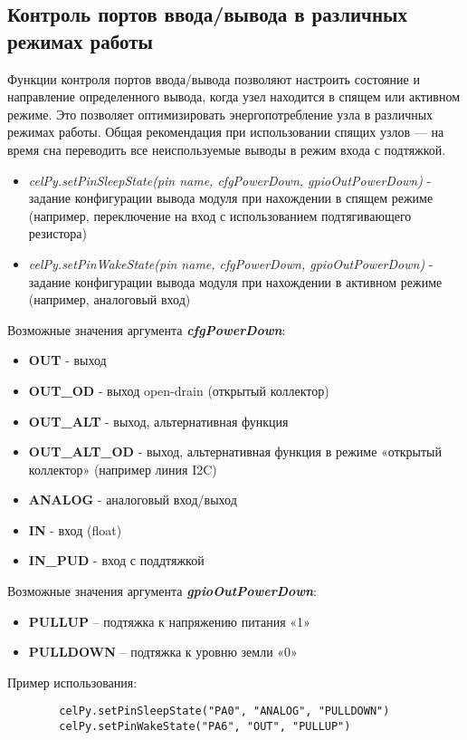 \documentclass[12pt]{article}
\begin{document}
\subsection{Контроль портов ввода/вывода в различных режимах работы}
Функции контроля портов ввода/вывода позволяют настроить состояние и направление
определенного вывода, когда узел находится в спящем или активном режиме.
Это позволяет оптимизировать энергопотребление узла в различных режимах работы.
Общая рекомендация при использовании спящих узлов --- на время сна переводить все
неиспользуемые выводы в режим входа с подтяжкой.
    \begin{itemize}
    \item \emph{celPy.setPinSleepState(pin name, cfgPowerDown, gpioOutPowerDown)}
    - задание конфигурации вывода модуля при нахождении в спящем режиме (например, 
    переключение на вход с использованием подтягивающего резистора)
    \item \emph{celPy.setPinWakeState(pin name, cfgPowerDown, gpioOutPowerDown)}
    - задание конфигурации вывода модуля при нахождении в активном режиме (например,
    аналоговый вход)
    \end{itemize}

Возможные значения аргумента \textit{\textbf{cfgPowerDown}}:
    \begin{itemize}
    \item \textbf{OUT} - выход
    \item \textbf{OUT_OD} - выход open-drain (открытый коллектор)
    \item \textbf{OUT_ALT} - выход, альтернативная функция 
    \item \textbf{OUT_ALT_OD} - выход, альтернативная функция в режиме «открытый коллектор» (например линия I2C)
    \item \textbf{ANALOG} - аналоговый вход/выход
    \item \textbf{IN} - вход (float)
    \item \textbf{IN_PUD} - вход с поддтяжкой
    \end{itemize}
    
Возможные значения аргумента \textit{\textbf{gpioOutPowerDown}}:
    \begin{itemize}
    \item \textbf{PULLUP} -- подтяжка к напряжению питания «1»
    \item \textbf{PULLDOWN} -- подтяжка к уровню земли «0»
    \end{itemize}

Пример использования:
    \begin{verbatim}
        celPy.setPinSleepState("PA0", "ANALOG", "PULLDOWN")
        celPy.setPinWakeState("PA6", "OUT", "PULLUP")
    \end{verbatim}
\end{document}
